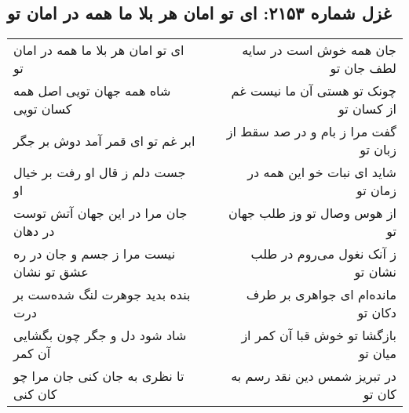 \begin{center}
\section*{غزل شماره ۲۱۵۳: ای تو امان هر بلا ما همه در امان تو}
\label{sec:2153}
\begin{longtable}{l p{0.5cm} r}
ای تو امان هر بلا ما همه در امان تو
&&
جان همه خوش است در سایه لطف جان تو
\\
شاه همه جهان تویی اصل همه کسان تویی
&&
چونک تو هستی آن ما نیست غم از کسان تو
\\
ابر غم تو ای قمر آمد دوش بر جگر
&&
گفت مرا ز بام و در صد سقط از زبان تو
\\
جست دلم ز قال او رفت بر خیال او
&&
شاید ای نبات خو این همه در زمان تو
\\
جان مرا در این جهان آتش توست در دهان
&&
از هوس وصال تو وز طلب جهان تو
\\
نیست مرا ز جسم و جان در ره عشق تو نشان
&&
ز آنک نغول می‌روم در طلب نشان تو
\\
بنده بدید جوهرت لنگ شده‌ست بر درت
&&
مانده‌ام ای جواهری بر طرف دکان تو
\\
شاد شود دل و جگر چون بگشایی آن کمر
&&
بازگشا تو خوش قبا آن کمر از میان تو
\\
تا نظری به جان کنی جان مرا چو کان کنی
&&
در تبریز شمس دین نقد رسم به کان تو
\\
\end{longtable}
\end{center}
